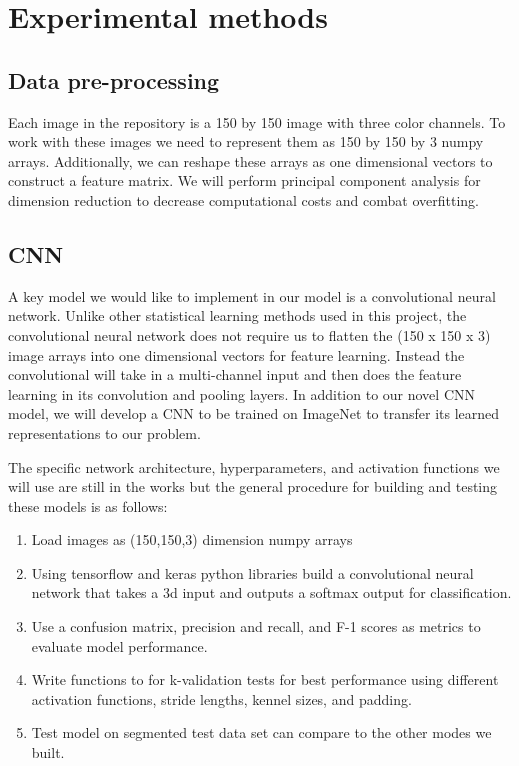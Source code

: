 \documentclass{article}
\begin{document}
\section{Experimental methods}

\subsection{Data pre-processing}

Each image in the repository is a 150 by 150 image with three color channels. To work with these images we need to represent them as 150 by 150 by 3 numpy arrays. Additionally, we can reshape these arrays as one dimensional vectors to construct a feature matrix. We will perform principal component analysis for dimension reduction to decrease computational costs and combat overfitting. 

\subsection{CNN} 

\par A key model we would like to implement in our model is a convolutional neural network. Unlike other statistical learning methods used in this project, the convolutional neural network does not require us to flatten the (150 x 150 x 3) image arrays into one dimensional vectors for feature learning. Instead the convolutional will take in a multi-channel input and then does the feature learning in its convolution and pooling layers. In addition to our novel CNN model, we will develop a CNN to be trained on ImageNet to transfer its learned representations to our problem.

The specific network architecture, hyperparameters, and activation functions we will use are still in the works but the general procedure for building and testing these models is as follows:

\begin{enumerate}
    \item Load images as (150,150,3) dimension numpy arrays
    \item Using tensorflow and keras python libraries build a convolutional neural network that takes a 3d input and outputs a softmax output for classification.
    \item Use a confusion matrix, precision and recall, and F-1 scores as metrics to evaluate model performance. 
    \item Write functions to for k-validation tests for best performance using different activation functions, stride lengths, kennel sizes, and padding.
    \item Test model on segmented test data set can compare to the other modes we built.
    
    
\end{enumerate}
\end{document}
